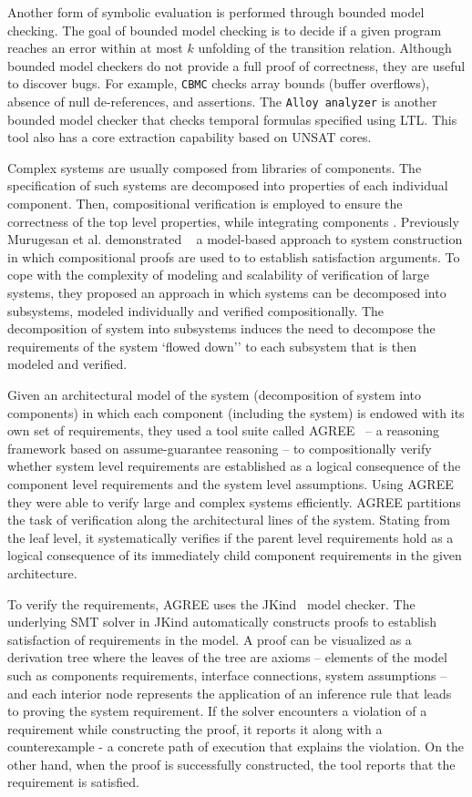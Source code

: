 Another form of symbolic evaluation is performed through bounded model checking.
The goal of bounded model checking is to decide if a given program reaches an error within at
most $k$ unfolding of the transition relation. Although bounded model checkers do not provide a full proof of correctness, they are useful to discover bugs. For example, \texttt{CBMC} \cite{cbmc} checks array bounds (buffer overflows), absence of
null de-references, and assertions. The \texttt{Alloy analyzer} \cite{alloy} is another bounded model checker that checks temporal formulas specified using LTL. This tool also has a core extraction capability based on UNSAT cores.

Complex systems are usually composed from libraries of components. The specification of such systems are decomposed into properties of each individual component. Then, compositional verification is employed to ensure the correctness of the top level properties, while integrating components \cite{NFM2012:CoGaMiWhLaLu}. Previously Murugesan et al. demonstrated ~\cite{hilt2013} a model-based approach to system construction in which compositional proofs are used to to establish satisfaction arguments. To cope with the complexity of modeling and scalability of verification of large systems,
they proposed an approach in which systems can be decomposed into subsystems, modeled individually and verified compositionally. The decomposition of system into subsystems induces the need to decompose the requirements of the system `flowed down'' to each subsystem that is then modeled and verified.

Given an architectural model of the system (decomposition of system into components) in which each component (including the system) is endowed with its own set of requirements,
 they used a tool suite called AGREE~\cite{NFM2012:CoGaMiWhLaLu} -- a reasoning framework based on assume-guarantee reasoning -- to compositionally verify whether system level requirements are established as a logical consequence of the component level requirements and the system level assumptions.
 Using AGREE they were able to verify large and complex systems efficiently. AGREE partitions the task of verification along the architectural lines of the system. Stating from the leaf level, it systematically verifies if the parent level requirements hold as a logical consequence of its immediately child component requirements in the given architecture.

To verify the requirements, AGREE uses the JKind~\cite{jkind} model checker. The underlying SMT solver in JKind automatically constructs proofs to establish satisfaction of requirements in the model. A proof can be visualized as a derivation tree where the leaves of the tree are axioms -- elements of the model such as components requirements, interface connections, system assumptions -- and each interior node represents the application of an inference rule that leads to proving the system requirement. If the solver encounters a violation of a requirement while constructing the proof, it reports it along with a counterexample - a concrete path of execution that explains the violation. On the other hand, when the proof is successfully constructed, the tool reports that the requirement is satisfied.

